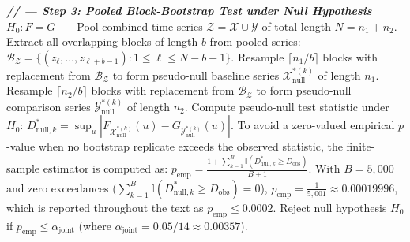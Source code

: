 \begin{algorithm*}[t]
\begin{algorithmic}[1]
\Statex
\Statex \textbf{\textit{// --- Step 3: Pooled Block-Bootstrap Test under Null Hypothesis $H_0: F = G$ ---}}
\State Pool combined time series $\mathcal{Z} = \mathcal{X} \cup \mathcal{Y}$ of total length $N = n_1 + n_2$.
\State Extract all overlapping blocks of length $b$ from pooled series: $\mathcal{B}_{\mathcal{Z}} = \{ (z_\ell, \dots, z_{\ell+b-1}) : 1 \le \ell \le N - b + 1 \}$.
    \State Resample $\lceil n_1 / b \rceil$ blocks with replacement from $\mathcal{B}_{\mathcal{Z}}$ to form pseudo-null baseline series $\mathcal{X}_{\text{null}}^{*(k)}$ of length $n_1$.
    \State Resample $\lceil n_2 / b \rceil$ blocks with replacement from $\mathcal{B}_{\mathcal{Z}}$ to form pseudo-null comparison series $\mathcal{Y}_{\text{null}}^{*(k)}$ of length $n_2$.
    \State Compute pseudo-null test statistic under $H_0$: $D_{\text{null}, k}^* = \sup_{u} |F_{\mathcal{X}_{\text{null}}^{*(k)}}(u) - G_{\mathcal{Y}_{\text{null}}^{*(k)}}(u)|$.
\EndFor
\State To avoid a zero-valued empirical $p$-value when no bootstrap replicate exceeds the observed statistic, the finite-sample estimator is computed as:
\Statex \qquad $p_{\text{emp}} = \frac{1 + \sum_{k=1}^B \mathbb{I}\left(D_{\text{null}, k}^* \ge D_{\text{obs}}\right)}{B + 1}$.
\Statex With $B = 5{,}000$ and zero exceedances ($\sum_{k=1}^B \mathbb{I}(D_{\text{null}, k}^* \ge D_{\text{obs}}) = 0$), $p_{\text{emp}} = \frac{1}{5{,}001} \approx 0.00019996$, which is reported throughout the text as $p_{\text{emp}} \le 0.0002$.
\State Reject null hypothesis $H_0$ if $p_{\text{emp}} \le \alpha_{\text{joint}}$ (where $\alpha_{\text{joint}} = 0.05 / 14 \approx 0.00357$).
\end{algorithmic}
\end{algorithm*}
